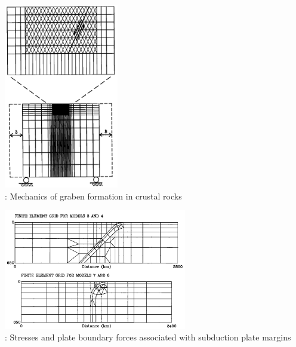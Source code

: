 \begin{center}
\begin{minipage}{0.35\textwidth}
\centering
\includegraphics[width=5cm]{images/history/mewi89}\\
{: Mechanics of graben formation in crustal rocks \cite{mewi89}}
\end{minipage}\hfill
\begin{minipage}{0.55\textwidth}
\centering
\includegraphics[width=8cm]{images/history/whbw92}\\
{: Stresses and plate boundary forces associated with subduction plate margins
\cite{whbw92}}
\end{minipage}
\end{center}


